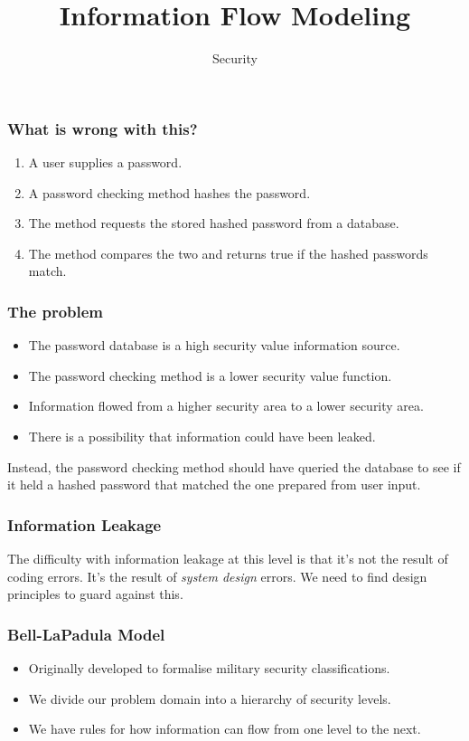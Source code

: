\documentclass[10pt]{beamer}
\title{Information Flow Modeling}
\author[IN618]{Security}
\institute[Otago Polytechnic]{
  Otago Polytechnic \\
  Dunedin, New Zealand \\
}
\date{}
\begin{document}
\begin{frame}[plain]
  \titlepage
\end{frame}


\begin{frame}
	\frametitle{What is wrong with this?}
	
	\begin{enumerate}
		\item A user supplies a password.
		\item A password checking method hashes the password.
		\item The method requests the stored hashed password from a database.
		\item The method compares the two and returns true if the hashed passwords match.
	\end{enumerate}
\end{frame}

\begin{frame}
	\frametitle{The problem}
	\begin{itemize}
		\item The password database is a high security value information source.
		\item The password checking method is a lower security value function.
		\item Information flowed from a higher security area to a lower security area.
		\item There is a possibility that information could have been leaked.
	\end{itemize}
	
	Instead, the password checking method should have queried the database to see if it held a 
	hashed password that matched the one prepared from user input.
\end{frame}

\begin{frame}
	\frametitle{Information Leakage}
	
	The difficulty with information leakage at this level is that it's not the result
	of coding errors.  It's the result of \emph{system design} errors. We need to find 
	design principles to guard against this.
\end{frame}

\begin{frame}
	\frametitle{Bell-LaPadula Model}
	
	\begin{itemize}
		\item Originally developed to formalise military security classifications.
		\item We divide our problem domain into a hierarchy of security levels.
		\item We have rules for how information can flow from one level to the next.
	\end{itemize}
\end{frame}
\end{document}
